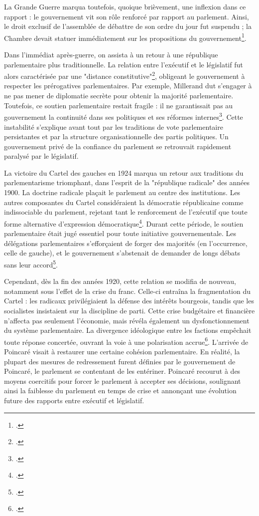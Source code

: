 \documentclass[a4paper,twoside,12pt]{book}
\begin{document}
La Grande Guerre marqua toutefois, quoique brièvement, une inflexion dans ce rapport : le gouvernement vit son rôle renforcé par rapport au parlement. Ainsi, le droit exclusif de l'assemblée de débattre de son ordre du jour fut suspendu ; la Chambre devait statuer immédiatement sur les propositions du gouvernement\footcite[p.227]{morel2024}.

Dans l'immédiat après-guerre, on assista à un retour à une république parlementaire plus traditionnelle. La relation entre l'exécutif et le législatif fut alors caractérisée par une "distance constitutive"\footcite[p.341]{zotero-515}, obligeant le gouvernement à respecter les prérogatives parlementaires. Par exemple, Millerand dut s'engager à ne pas mener de diplomatie secrète pour obtenir la majorité parlementaire. Toutefois, ce soutien parlementaire restait fragile : il ne garantissait pas au gouvernement la continuité dans ses politiques et ses réformes internes\footcite[p.343]{zotero-515}. Cette instabilité s'explique avant tout par les traditions de vote parlementaire persistantes et par la structure organisationnelle des partis politiques. Un gouvernement privé de la confiance du parlement se retrouvait rapidement paralysé par le législatif.

La victoire du Cartel des gauches en 1924 marqua un retour aux traditions du parlementarisme triomphant, dans l'esprit de la "république radicale" des années 1900. La doctrine radicale plaçait le parlement au centre des institutions. Les autres composantes du Cartel considéraient la démocratie républicaine comme indissociable du parlement, rejetant tant le renforcement de l'exécutif que toute forme alternative d'expression démocratique\footcite[p.347]{zotero-515}. Durant cette période, le soutien parlementaire était jugé essentiel pour toute initiative gouvernementale. Les délégations parlementaires s'efforçaient de forger des majorités (en l'occurrence, celle de gauche), et le gouvernement s'abstenait de demander de longs débats sans leur accord\footcite[p.348]{zotero-515}.

Cependant, dès la fin des années 1920, cette relation se modifia de nouveau, notamment sous l'effet de la crise du franc. Celle-ci entraîna la fragmentation du Cartel : les radicaux privilégiaient la défense des intérêts bourgeois, tandis que les socialistes insistaient sur la discipline de parti. Cette crise budgétaire et financière n'affecta pas seulement l'économie, mais révéla également un dysfonctionnement du système parlementaire. La divergence idéologique entre les factions empêchait toute réponse concertée, ouvrant la voie à une polarisation accrue\footcite[p.349]{zotero-515}. L'arrivée de Poincaré visait à restaurer une certaine cohésion parlementaire. En réalité, la plupart des mesures de redressement furent définies par le gouvernement de Poincaré, le parlement se contentant de les entériner. Poincaré recourut à des moyens coercitifs pour forcer le parlement à accepter ses décisions, soulignant ainsi la faiblesse du parlement en temps de crise et annonçant une évolution future des rapports entre exécutif et législatif.
\end{document}
